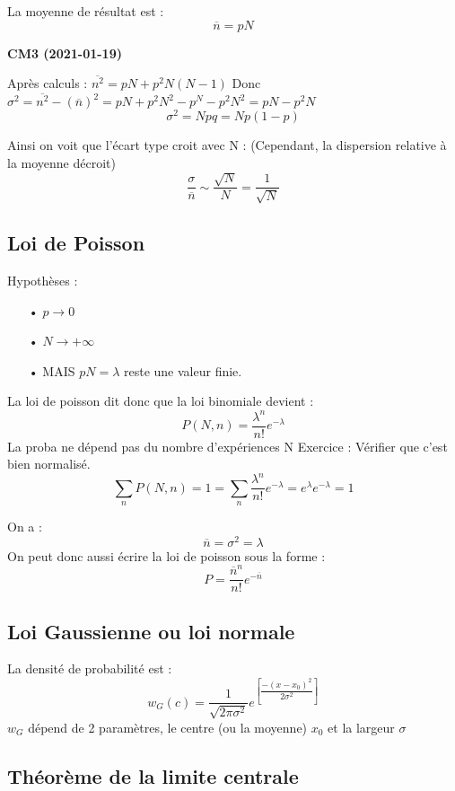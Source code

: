 \documentclass[12pt,a4paper]{report}
\begin{document}
La moyenne de résultat est :
\[
	\overline{n} = pN
\]

\begin{center}
\textbf{CM3 (2021-01-19)}
\end{center}

Après calculs : \(\overline{n^2} = pN + p^2N(N-1)\)
Donc \(\sigma^2 = \overline{n^2} - (\overline{n})^2 = pN + p^2N^2 - p^N - p^2N^2 = pN - p^2N\)
\[
	\sigma^2 = N p q = Np(1-p)
\]

Ainsi on voit que l'écart type croit avec N :
(Cependant, la dispersion relative à la moyenne décroit)
\[
	\dfrac{\sigma}{\overline{n}} \sim \dfrac{\sqrt{N}}{N} = \dfrac{1}{\sqrt{N}}
\]

\subsection{Loi de Poisson}

Hypothèses :
\begin{itemize}
	\item[•] \(p \rightarrow 0\)
	\item[•] \(N \rightarrow +\infty\)
	\item[•] MAIS \(pN = \lambda\) reste une valeur finie.
\end{itemize}

La loi de poisson dit donc que la loi binomiale devient :
\[
	P(N, n) = \dfrac{\lambda^n}{n!}e^{-\lambda}
\]
La proba ne dépend pas du nombre d'expériences N
Exercice : Vérifier que c'est bien normalisé.
\[
	\sum_n P(N,n) = 1 = \sum_n \dfrac{\lambda^n}{n!}e^{-\lambda} = e^\lambda e^{-\lambda} = 1
\]

On a :
\[
	\overline{n} = \sigma^2 = \lambda
\]
On peut donc aussi écrire la loi de poisson sous la forme :
\[
	P = \dfrac{\overline{n}^n}{n!}e^{-\overline{n}}
\]

\subsection{Loi Gaussienne ou loi normale}

La densité de probabilité est :
\[
	w_G (c) = \dfrac{1}{\sqrt{2\pi \sigma^2}} e^{\left[ \dfrac{- (x-x_0)^2}{2\sigma^2} \right]}
\]
\(w_G\) dépend de 2 paramètres, le centre (ou la moyenne) \(x_0\) et la largeur \(\sigma\)

\subsection{Théorème de la limite centrale}
\end{document}
